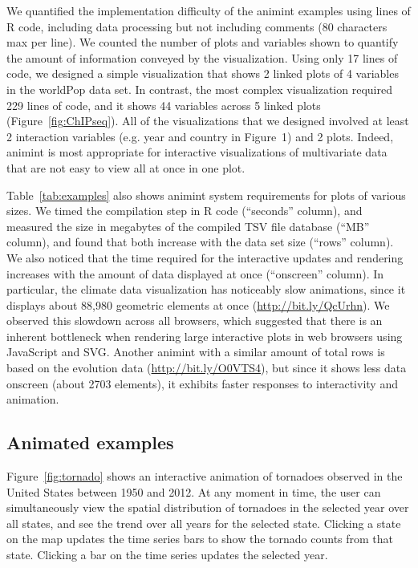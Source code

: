 \documentclass[journal]{vgtc}\usepackage[]{graphicx}\usepackage[]{color}
\begin{document}
We quantified the implementation difficulty of the animint examples
using lines of R code, including data processing but not including
comments (80 characters max per line). We counted the number of plots
and variables shown to quantify the amount of information conveyed by
the visualization. Using only 17 lines of code, we designed a simple
visualization that shows 2 linked plots of 4 variables in the worldPop
data set. In contrast, the most complex visualization required 229
lines of code, and it shows 44 variables across 5 linked plots
(Figure~\ref{fig:ChIPseq}). All of the visualizations that we designed
involved at least 2 interaction variables (e.g. year and country in
Figure~1) and 2 plots. Indeed, animint is most appropriate for
interactive visualizations of multivariate data that are not easy to
view all at once in one plot.

Table~\ref{tab:examples} also shows animint system requirements for
plots of various sizes. We timed the compilation step in R code
(``seconds'' column), and measured the size in megabytes of the
compiled TSV file database (``MB'' column), and found that both
increase with the data set size (``rows'' column).
We also noticed that the time required for the interactive updates and
rendering increases with the amount of data displayed at once
(``onscreen'' column). In particular, the climate data visualization
has noticeably slow animations, since it displays about 88,980
geometric elements at once (\url{http://bit.ly/QcUrhn}). We observed
this slowdown across all browsers, which suggested that there is an
inherent bottleneck when rendering large interactive plots in web
browsers using JavaScript and SVG. Another animint with a similar
amount of total rows is based on the evolution data
(\url{http://bit.ly/O0VTS4}), but since it shows less data onscreen
(about 2703 elements), it exhibits faster responses to interactivity
and animation.

\subsection{Animated examples}

Figure~\ref{fig:tornado} shows an interactive animation of tornadoes
observed in the United States between 1950 and 2012. At any moment in
time, the user can simultaneously view the spatial distribution of
tornadoes in the selected year over all states, and see the trend over
all years for the selected state. Clicking a state on the map updates the
time series bars to show the tornado counts from that state. Clicking
a bar on the time series updates the selected year.
\end{document}
